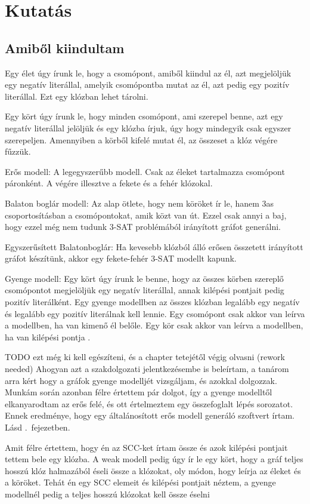 \documentclass[
]{thesis-ekf}
\theoremstyle{definition}
\theoremstyle{remark}
\begin{document}
	\chapter{Kutatás}
	\section{Amiből kiindultam}
	
	Egy élet úgy írunk le, hogy a csomópont, amiből kiindul az él, azt megjelöljük egy negatív literállal, amelyik csomópontba mutat az él, azt pedig egy pozitív literállal. Ezt egy klózban lehet tárolni.
	
	Egy kört úgy írunk le, hogy minden csomópont, ami szerepel benne, azt egy negatív literállal jelöljük és egy klózba írjuk, úgy hogy mindegyik csak egyszer szerepeljen. Amennyiben a körből kifelé mutat él, az összeset a klóz végére fűzzük.
	
	Erős modell: A legegyszerűbb modell. Csak az éleket tartalmazza csomópont páronként. A végére illesztve a fekete és a fehér klózokal.
		
	Balaton boglár modell: Az alap ötlete, hogy nem köröket ír le, hanem 3as csoportosításban a csomópontokat, amik közt van út. Ezzel csak annyi a baj, hogy ezzel még nem tudunk 3-SAT problémából irányított gráfot generálni.
	
	Egyszerűsített Balatonboglár: Ha kevesebb klózból álló erősen összetett irányított gráfot készítünk, akkor egy fekete-fehér 3-SAT modellt kapunk.

	Gyenge modell: Egy kört úgy írunk le benne, hogy az összes körben szereplő csomópontot megjelöljük egy negatív literállal, annak kilépési pontjait pedig pozitív literálként. Egy gyenge modellben az összes klózban legalább egy negatív és legalább egy pozitív literálnak kell lennie. Egy csomópont csak akkor van leírva a modellben, ha van kimenő él belőle. Egy kör csak akkor van leírva a modellben, ha van kilépési pontja \cite{sat-solving-50}.
	
	TODO ezt még ki kell egészíteni, és a chapter tetejétől végig olvasni (rework needed)
	Ahogyan azt a szakdolgozati jelentkezésembe is beleírtam, a tanárom arra kért hogy a gráfok gyenge modelljét vizsgáljam, és azokkal dolgozzak. Munkám során azonban félre értettem pár dolgot, így a gyenge modelltől elkanyarodtam az erős felé, és ott értelmeztem egy összefoglalt lépés sorozatot. Ennek eredménye, hogy egy általánosított erős modell generáló szoftvert írtam. Lásd .~fejezetben.
	
	Amit félre értettem, hogy én az SCC-ket írtam össze és azok kilépési pontjait tettem bele egy klózba. A weak modell pedig úgy ír le egy kört, hogy a gráf teljes hosszú klóz halmazából éseli össze a klózokat, oly módon, hogy leírja az éleket és a köröket. Tehát én egy SCC elemeit és kilépési pontjait néztem, a gyenge modellnél pedig a teljes hosszú klózokat kell össze éselni 
\end{document}
